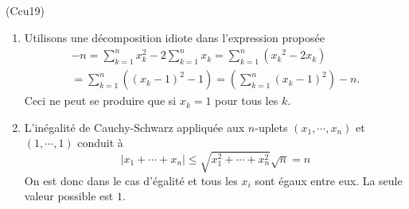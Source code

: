 \begin{tiny}(Ccu19)\end{tiny}
\begin{enumerate}
  \item Utilisons une décomposition idiote dans l'expression proposée
\begin{multline*}
  -n = \sum_{k=1}^nx^2_k -2\sum_{k=1}^nx_k 
  = \sum_{k=1}^n({x_k}^2 - 2x_k) \\
  = \sum_{k=1}^n\left( (x_k - 1)^2 - 1\right)
  = \left( \sum_{k=1}^n(x_k - 1)^2\right)  - n.
\end{multline*}
Ceci ne peut se produire que si $x_k = 1$ pour tous les $k$.
  \item L'inégalité de Cauchy-Schwarz appliquée aux $n$-uplets $(x_1,\cdots,x_n)$ et $(1,\cdots,1)$ conduit à
\begin{displaymath}
\left| x_1+\cdots+x_n\right|\leq 
\sqrt{x^2_1+\cdots+x^2_n} \sqrt{n} = n 
\end{displaymath}
On est donc dans le cas d'égalité et tous les $x_i$ sont égaux entre eux. La seule valeur possible est $1$. 
\end{enumerate}
